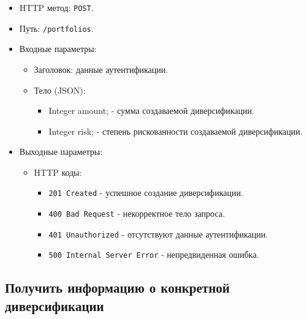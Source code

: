 \documentclass[a4paper, 14pt]{article}
\begin{document}
\begin{itemize}
    \item HTTP метод: \texttt{POST}.
    \item Путь: \texttt{/portfolios}.
    \item Входные параметры:
    \begin{itemize}
        \item Заголовок: данные аутентификации.
        \item Тело (JSON):
        \begin{itemize}
            \item Integer amount; - сумма создаваемой диверсификации.
            \item Integer risk; - степень рискованности создаваемой диверсификации.
        \end{itemize}
    \end{itemize}
    \item Выходные параметры:
    \begin{itemize}
        \item HTTP коды:
        \begin{itemize}
            \item \texttt{201 Created} - успешное создание диверсификации.
            \item \texttt{400 Bad Request} - некорректное тело запроса.
            \item \texttt{401 Unauthorized} - отсутствуют данные аутентификации.
            \item \texttt{500 Internal Server Error} - непредвиденная ошибка.
        \end{itemize}
    \end{itemize}
\end{itemize}

\subsection{Получить информацию о конкретной диверсификации}
\end{document}
